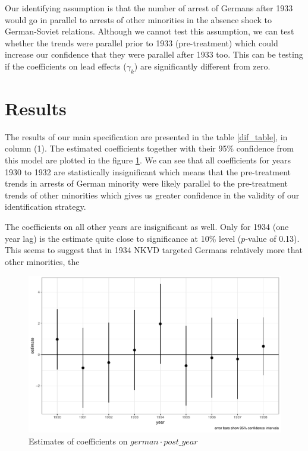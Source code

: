 \documentclass[11pt]{article}
\begin{document}
Our identifying assumption is that the number of arrest of Germans after 1933 would go in parallel to arrests of other minorities in the absence shock to German-Soviet relations. Although we cannot test this assumption, we can test whether the trends were parallel prior to 1933 (pre-treatment) which could increase our confidence that they were parallel after 1933 too. This can be testing if the coefficients on lead effects ($\gamma_k$) are significantly different from zero.  
\section{Results}
The results of our main specification are presented in the table \ref{dif_table}, in column (1). The estimated coefficients together with their 95\% confidence  from this model are plotted in the figure \ref{fig_did_effets}. We can see that all coefficients for years 1930 to 1932 are statistically insignificant which means that the pre-treatment trends in arrests of German minority were likely parallel to the pre-treatment trends of other minorities which gives us greater  confidence in the validity of our identification strategy. 

The coefficients on all other years are insignificant as well. Only for 1934 (one year lag) is the estimate  quite close to significance at 10\% level ($p$-value of 0.13). This seems to suggest that in 1934 NKVD targeted Germans  relatively more that other minorities, the 
\begin{figure}[h]
\centering
\includegraphics[width=\textwidth]{plots/did_effects.pdf}
\caption{Estimates of coefficients on $german \cdot post\_year$}
\label{fig_did_effets}
\end{figure}
\end{document}

